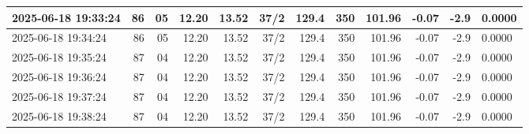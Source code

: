 \documentclass[UTF8,10pt,a4paper,fontset=fandol]{ctexart}
\begin{document}
{\begin{minipage}{0.96\textheight}
\begin{tabular}{|p{2.05cm}|r|r|r|r|r|r|r|r|r|r|p{2.0cm}|}
2025-06-18 19:33:24 & 86 & 05 & 12.20 & 13.52 & 37/2 & 129.4 & 350 & 101.96 & -0.07 & -2.9 & 0.0000 \\ \hline
2025-06-18 19:34:24 & 86 & 05 & 12.20 & 13.52 & 37/2 & 129.4 & 350 & 101.96 & -0.07 & -2.9 & 0.0000 \\ \hline
2025-06-18 19:35:24 & 87 & 04 & 12.20 & 13.52 & 37/2 & 129.4 & 350 & 101.96 & -0.07 & -2.9 & 0.0000 \\ \hline
2025-06-18 19:36:24 & 87 & 04 & 12.20 & 13.52 & 37/2 & 129.4 & 350 & 101.96 & -0.07 & -2.9 & 0.0000 \\ \hline
2025-06-18 19:37:24 & 87 & 04 & 12.20 & 13.52 & 37/2 & 129.4 & 350 & 101.96 & -0.07 & -2.9 & 0.0000 \\ \hline
2025-06-18 19:38:24 & 87 & 04 & 12.20 & 13.52 & 37/2 & 129.4 & 350 & 101.96 & -0.07 & -2.9 & 0.0000 \\ \hline
\end{tabular}

\end{minipage}%
}

\newpage
\end{document}
